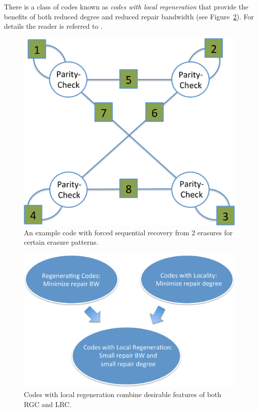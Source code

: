 \begin{multicols}{2}
There is a class of codes known as {\em codes with local regeneration} that provide the benefits of both reduced degree and reduced repair bandwidth (see Figure~\ref{fig:CLG_idea}).  For details the reader is referred to \cite{KamPraLalKum,RawKoySilVis,KrishnanRK18}.\\[-15pt]

\begin{figure}[H]
\centering
\includegraphics{src/Figures/chap4/turan.jpg}  
\caption{An example code with forced sequential recovery from $2$ erasures for certain erasure patterns.}  \label{fig:turan}    
\end{figure}	 

\begin{figure}[H]
\centering
\includegraphics{src/Figures/chap4/CLG_idea.jpg}  
\caption{Codes with local regeneration combine desirable features of both RGC and LRC.}  \label{fig:CLG_idea}    
\end{figure}


\end{multicols}
